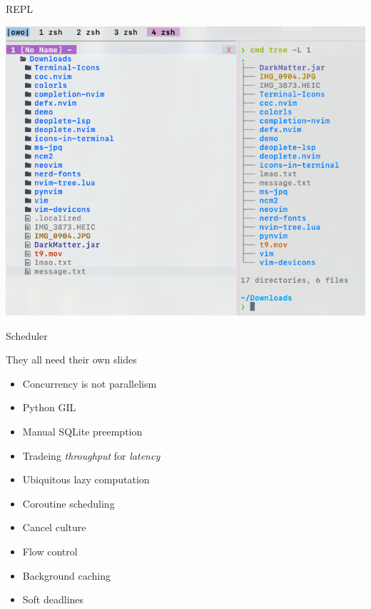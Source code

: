 \documentclass{beamer}
\begin{document}
\begin{frame}{REPL}

	\includegraphics[width=\textwidth]{chadtree_ls}

\end{frame}


\begin{frame}{Scheduler}

	They all need their own slides

	\begin{itemize}

		\item Concurrency is not parallelism

		\item Python GIL

		\item Manual SQLite preemption

		\item Tradeing \textit{throughput} for \textit{latency}

		\item Ubiquitous lazy computation

		\item Coroutine scheduling

		\item Cancel culture

		\item Flow control

		\item Background caching

		\item Soft deadlines

	\end{itemize}

\end{frame}
\end{document}
